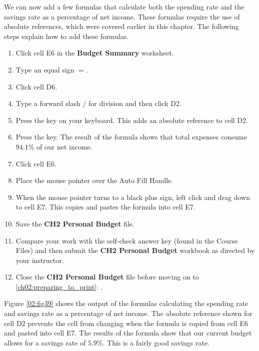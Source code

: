 We can now add a few formulas that calculate both the spending rate and the savings rate as a percentage of net income. These formulas require the use of absolute references, which were covered earlier in this chapter. The following steps explain how to add these formulas.

\begin{enumerate}
	\item Click cell \textsf{E6} in the \textbf{Budget Summary} worksheet.
	\item Type an equal sign $ = $.
	\item Click cell \textsf{D6}.
	\item Type a forward slash $ / $ for division and then click \textsf{D2}.
	\item Press the  key on your keyboard. This adds an absolute reference to cell \textsf{D2}.
	\item Press the  key. The result of the formula shows that total expenses consume $ 94.1\% $ of our net income.
	\item Click cell \textsf{E6}.
	\item Place the mouse pointer over the Auto Fill Handle.
	\item When the mouse pointer turns to a black plus sign, left click and drag down to cell \textsf{E7}. This copies and pastes the formula into cell \textsf{E7}.
	\item Save the \textbf{CH2 Personal Budget} file.
	\item Compare your work with the self-check answer key (found in the Course Files) and then submit the \textbf{CH2 Personal Budget} workbook as directed by your instructor.
	\item Close the \textbf{CH2 Personal Budget} file before moving on to \ref{ch02:preparing_to_print}: .
\end{enumerate}

Figure \ref{02:fig39} shows the output of the formulas calculating the spending rate and savings rate as a percentage of net income. The absolute reference shown for cell \textsf{D2} prevents the cell from changing when the formula is copied from cell \textsf{E6} and pasted into cell \textsf{E7}. The results of the formula show that our current budget allows for a savings rate of $ 5.9\% $. This is a fairly good savings rate.

